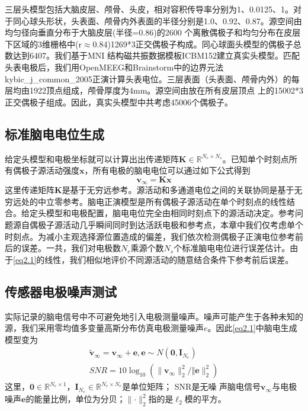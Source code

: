 三层头模型包括大脑皮层、颅骨、头皮，相对容积传导率分别为1、0.0125、1。对于同心球头形状，头表面、颅骨内外表面的半径分别是1.0、0.92、0.87。源空间由均匀径向垂直分布于大脑皮层(半径=0.86)的2600
个离散偶极子和均匀分布在皮层下区域的3维栅格中(r$\approx$0.84)1269*3正交偶极子构成。同心球面头模型的偶极子总数达到6407。我们基于MNI
结构磁共振数据模板ICBM152建立真实头模型。匹配头表电极后，我们用OpenMEEG和Brainstorm中的边界元法\citing
{kybic_j_common_2005}正演计算头表电位。三层表面（头表面、颅骨内外）的每层均由1922顶点组成，颅骨厚度为4mm。源空间由放在所有皮层顶点
上的15002*3正交偶极子组成。因此，真实头模型中共考虑45006个偶极子。

\subsection{标准脑电电位生成}
给定头模型和电极坐标就可以计算出出传递矩阵$\mathbf{K}\in{\mathbb{R}^{N_e\times{N_s}}}$。已知单个时刻点所有偶极子源活动强度$\mathbf{x}$，所有电极的脑电电位可以通过如下公式得到
\begin{equation}\label{eq2.1}
\mathbf{v}_{\infty}=\mathbf{Kx}
\end{equation}
这里传递矩阵$\mathbf{K}$是基于无穷远参考。源活动和多通道电位之间的关联协同是基于无穷远处的中立零参考。脑电正演模型是所有偶极子源活动在单个时刻点的线性结合。给定头模型和电极配置，脑电电位完全由相同时刻点下的源活动决定。参考问题源自偶极子源活动几乎瞬间同时到达活跃电极和参考点，本章中我们仅考虑单个时刻点。为减小主观选择源位置造成的偏差，我们依次检测偶极子正演电位参考前后的误差。一共，我们对电极数$N_e$乘源个数$N_s$个标准脑电电位进行误差估计。由于\eqref{eq2.1}的线性，我们相似地评价不同源活动的随意结合条件下参考前后误差。
\subsection{传感器电极噪声测试}
实际记录的脑电信号中不可避免地引入电极测量噪声。噪声可能产生于各种未知的源，我们采用零均值多变量高斯分布仿真电极测量噪声$e$。因此\eqref{eq2.1}中脑电生成模型变为
\begin{equation}\label{eq2.2}
\begin{aligned}
\tilde{\mathbf{v}}_\infty=\mathbf{v}_{\infty}+\mathbf{e},\mathbf{e}\sim{N(\mathbf{0},\mathbf{I}_{N_e})}\\
SNR=10\log_{10}(\lVert{\mathbf{v}_\infty}\rVert_2^2/\Vert{\mathbf{e}}\rVert_2^2)
\end{aligned}
\end{equation}
这里，$\mathbf{0}\in{\mathbb{R}^{N_e\times1}}$，$\mathbf{I}_{N_e}\in{\mathbb{R}^{N_e\times{N_e}}}$是单位矩阵； SNR是无噪
声脑电信号$\mathbf{v}_{\infty}$与电极噪声$\mathbf{e}$的能量比例，单位为分贝；$\lVert{\cdot}\rVert_2^2$指的是$\ell_2$模的平方。
